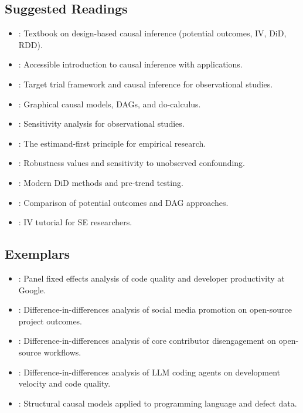 \subsection{Suggested Readings}

\begin{itemize}[leftmargin=15pt]
    \item \citet{angrist2009mostly}: Textbook on design-based causal inference (potential outcomes, IV, DiD, RDD).
    \item \citet{cunningham2021causal}: Accessible introduction to causal inference with applications.
    \item \citet{hernan2020causal}: Target trial framework and causal inference for observational studies.
    \item \citet{pearl2009causality}: Graphical causal models, DAGs, and do-calculus.
    \item \citet{rosenbaum2002observational}: Sensitivity analysis for observational studies.
    \item \citet{lundberg2021estimand}: The estimand-first principle for empirical research.
    \item \citet{cinelli2020making}: Robustness values and sensitivity to unobserved confounding.
    \item \citet{roth2023whats}: Modern DiD methods and pre-trend testing.
    \item \citet{imbens2020potential}: Comparison of potential outcomes and DAG approaches.
    \item \citet{DBLP:journals/tosem/GrafVlachyW24}: IV tutorial for SE researchers.
\end{itemize}

\subsection{Exemplars}

\begin{itemize}[leftmargin=15pt]
    \item \citet{DBLP:conf/sigsoft/ChengMCJGKZ022}: Panel fixed effects analysis of code quality and developer productivity at Google.
    \item \citet{DBLP:conf/icse/FangLHV22}: Difference-in-differences analysis of social media promotion on open-source project outcomes.
    \item \citet{DBLP:conf/icse/ChenSSGT26}: Difference-in-differences analysis of core contributor disengagement on open-source workflows.
    \item \citet{DBLP:conf/msr/HeMAKV26}: Difference-in-differences analysis of LLM coding agents on development velocity and code quality.
    \item \citet{DBLP:journals/tosem/FuriaTF24}: Structural causal models applied to programming language and defect data.
\end{itemize}

